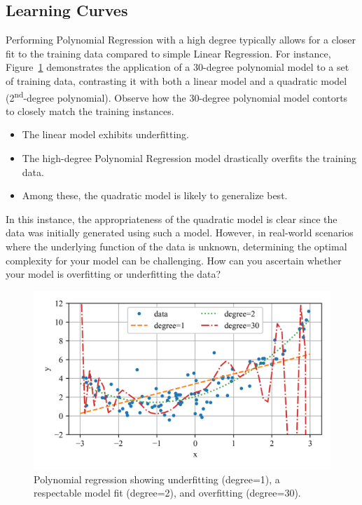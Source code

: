 \documentclass[12pt,letter]{article}
\begin{document}

\subsection{Learning Curves}

Performing Polynomial Regression with a high degree typically allows for a closer fit to the training data compared to simple Linear Regression. For instance, Figure~\ref{fig:overfitting_1} demonstrates the application of a 30-degree polynomial model to a set of training data, contrasting it with both a linear model and a quadratic model (2\textsuperscript{nd}-degree polynomial). Observe how the 30-degree polynomial model contorts to closely match the training instances.
\begin{itemize}
\item The linear model exhibits underfitting.
\item The high-degree Polynomial Regression model drastically overfits the training data.
\item Among these, the quadratic model is likely to generalize best.
\end{itemize}
In this instance, the appropriateness of the quadratic model is clear since the data was initially generated using such a model. However, in real-world scenarios where the underlying function of the data is unknown, determining the optimal complexity for your model can be challenging. How can you ascertain whether your model is overfitting or underfitting the data?

\begin{figure}[h]
\centering
\includegraphics[]{../figures/overfitting_1.png}
\caption{Polynomial regression showing underfitting (degree=1), a respectable model fit (degree=2), and overfitting (degree=30).}
\label{fig:overfitting_1}
\end{figure}
\end{document}
